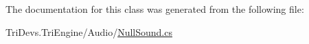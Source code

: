 The documentation for this class was generated from the following file\-:\begin{DoxyCompactItemize}
\item 
Tri\-Devs.\-Tri\-Engine/\-Audio/\hyperlink{_null_sound_8cs}{Null\-Sound.\-cs}\end{DoxyCompactItemize}
